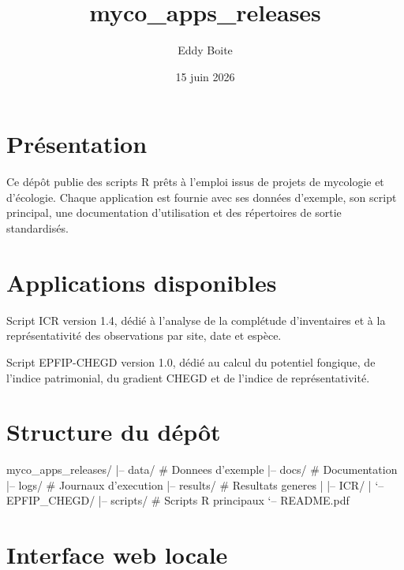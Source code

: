 \documentclass[11pt,a4paper]{article}
\title{myco\_apps\_releases}
\author{Eddy Boite}
\date{15 juin 2026}
\begin{document}
\maketitle
\tableofcontents
\newpage

\section{Présentation}

Ce dépôt publie des scripts R prêts à l'emploi issus de projets de mycologie et
d'écologie. Chaque application est fournie avec ses données d'exemple, son script
principal, une documentation d'utilisation et des répertoires de sortie standardisés.

\section{Applications disponibles}

\begin{description}[style=nextline,leftmargin=0pt,labelwidth=0pt,labelsep=0pt]
  \item[Inventaires fongiques --- Complétude et Représentativité]
  Script ICR version 1.4, dédié à l'analyse de la complétude d'inventaires et à la
  représentativité des observations par site, date et espèce.

  \item[Évaluation du potentiel fongique, intérêt patrimonial et gradient CHEGD]
  Script EPFIP-CHEGD version 1.0, dédié au calcul du potentiel fongique, de l'indice
  patrimonial, du gradient CHEGD et de l'indice de représentativité.
\end{description}

\section{Structure du dépôt}

\begin{CodeBlock}
myco_apps_releases/
|-- data/                         # Donnees d'exemple
|-- docs/                         # Documentation
|-- logs/                         # Journaux d'execution
|-- results/                      # Resultats generes
|   |-- ICR/
|   `-- EPFIP_CHEGD/
|-- scripts/                      # Scripts R principaux
`-- README.pdf
\end{CodeBlock}

\section{Interface web locale}
\end{document}
